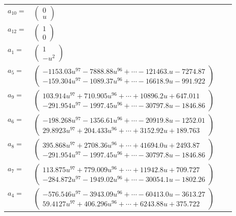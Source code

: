 \documentclass[1p]{elsarticle_modified}
\theoremstyle{definition}
\begin{document}
\begin{tabular}{m{7pt} m{180pt} m{7pt} m{180pt} }
\flushright $a_{10}=$&$\begin{pmatrix}0\\u\end{pmatrix}$ \\
\flushright $a_{12}=$&$\begin{pmatrix}1\\0\end{pmatrix}$ \\
\flushright $a_{1}=$&$\begin{pmatrix}1\\- u^2\end{pmatrix}$ \\
\flushright $a_{5}=$&$\begin{pmatrix}-1153.03 u^{97}-7888.88 u^{96}+\cdots-121463. u-7274.87\\-159.304 u^{97}-1089.37 u^{96}+\cdots-16618.9 u-991.922\end{pmatrix}$ \\
\flushright $a_{9}=$&$\begin{pmatrix}103.914 u^{97}+710.905 u^{96}+\cdots+10896.2 u+647.011\\-291.954 u^{97}-1997.45 u^{96}+\cdots-30797.8 u-1846.86\end{pmatrix}$ \\
\flushright $a_{6}=$&$\begin{pmatrix}-198.268 u^{97}-1356.61 u^{96}+\cdots-20919.8 u-1252.01\\29.8923 u^{97}+204.433 u^{96}+\cdots+3152.92 u+189.763\end{pmatrix}$ \\
\flushright $a_{8}=$&$\begin{pmatrix}395.868 u^{97}+2708.36 u^{96}+\cdots+41694.0 u+2493.87\\-291.954 u^{97}-1997.45 u^{96}+\cdots-30797.8 u-1846.86\end{pmatrix}$ \\
\flushright $a_{7}=$&$\begin{pmatrix}113.875 u^{97}+779.009 u^{96}+\cdots+11942.8 u+709.727\\-284.872 u^{97}-1949.02 u^{96}+\cdots-30054.1 u-1802.26\end{pmatrix}$ \\
\flushright $a_{4}=$&$\begin{pmatrix}-576.546 u^{97}-3943.09 u^{96}+\cdots-60413.0 u-3613.27\\59.4127 u^{97}+406.296 u^{96}+\cdots+6243.88 u+375.722\end{pmatrix}$ \\

\end{tabular}
\end{document}
